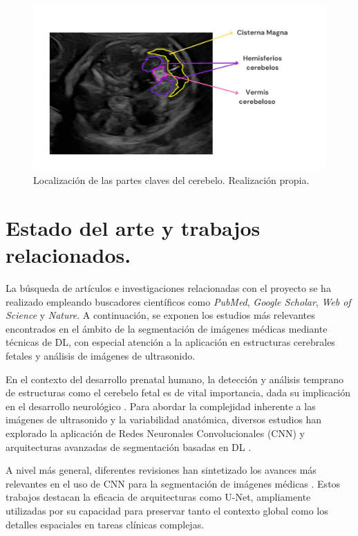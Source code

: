 \begin{figure}[h]
    \centering
    \includegraphics[width=\textwidth]{img/estructuras_interes.jpeg}
    \caption{Localización de las partes claves del cerebelo. Realización propia.}
    \label{fig: parte_anatomicas_cerebelo}
\end{figure}

\section{Estado del arte y trabajos relacionados.}

La búsqueda de artículos e investigaciones relacionadas con el proyecto se ha realizado empleando buscadores científicos como \textit{PubMed}, \textit{Google Scholar}, \textit{Web of Science} y \textit{Nature}. A continuación, se exponen los estudios más relevantes encontrados en el ámbito de la segmentación de imágenes médicas mediante técnicas de DL, con especial atención a la aplicación en estructuras cerebrales fetales y análisis de imágenes de ultrasonido.

En el contexto del desarrollo prenatal humano, la detección y análisis temprano de estructuras como el cerebelo fetal es de vital importancia, dada su implicación en el desarrollo neurológico \cite{volpe2009} \cite{koning2017impacts}. Para abordar la complejidad inherente a las imágenes de ultrasonido y la variabilidad anatómica, diversos estudios han explorado la aplicación de Redes Neuronales Convolucionales (CNN) y arquitecturas avanzadas de segmentación basadas en DL \cite{hesamian2019}.

A nivel más general, diferentes revisiones han sintetizado los avances más relevantes en el uso de CNN para la segmentación de imágenes médicas \cite{ajmal2018cnn, hesamian2019}. Estos trabajos destacan la eficacia de arquitecturas como U-Net, ampliamente utilizadas por su capacidad para preservar tanto el contexto global como los detalles espaciales en tareas clínicas complejas.

